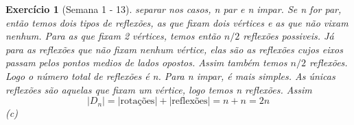 \documentclass{article}
\newtheorem*{ex}{Exercício}
\begin{document}
\begin{ex}[Semana 1 - 13]
    separar nos casos, n par e n impar. Se n for par, então temos dois tipos de reflexões, as que fixam 
    dois vértices e as que não vixam nenhum. Para as que fixam 2 vértices, temos então $n/2$ reflexões possiveis.
    Já para as reflexões que não fixam nenhum vértice, elas são as reflexões cujos eixos passam pelos
    pontos medios de lados opostos. Assim também temos $n/2$ reflexões. Logo o número total de reflexões é n.
    Para n impar, é mais simples. As únicas reflexões são aquelas que fixam um vértice, logo 
    temos n reflexões. Assim
    \[|D_n| = |\text{rotações}| + |\text{reflexões}| = n + n = 2n\]
    (c)
    \begin{center}

        \begin{tikzpicture}[x=0.75pt,y=0.75pt,yscale=-1,xscale=1]


\end{tikzpicture}
\end{center}
\end{ex}
\end{document}
